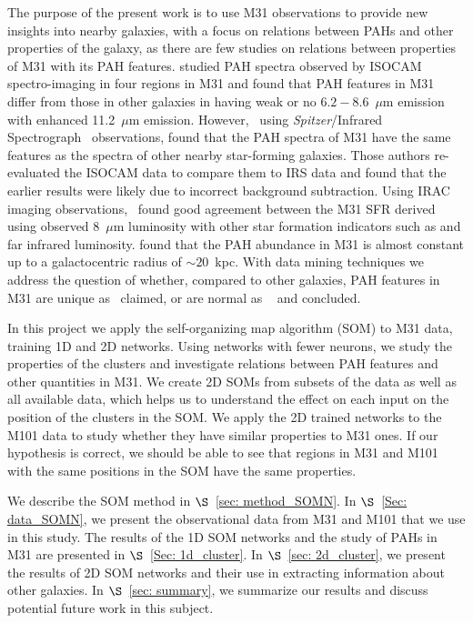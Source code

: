 The purpose of the present work is to use M31 observations to provide new insights into nearby galaxies, with a focus on relations between PAHs and other properties of the galaxy,
as there are few studies on relations between properties of M31 with its PAH features.
\cite{Cesarsky98} studied PAH spectra observed by ISOCAM spectro-imaging in four regions in M31 and found that PAH features in M31 differ from those in other galaxies in having weak or no $6.2 - 8.6$~$\mu$m emission with enhanced 11.2~$\mu$m emission. 
However,~\cite{Dim15} using {\it Spitzer}/Infrared Spectrograph~\citep[IRS;][]{Houck04b} observations, found that the PAH spectra of M31 have the same features as the spectra of other nearby star-forming galaxies.
Those authors re-evaluated the ISOCAM data to compare them to IRS data and found that the earlier results were likely due to incorrect background subtraction.
Using IRAC imaging observations,~\cite{Barmby06} found good agreement between the M31 SFR derived using observed 8~$\mu$m luminosity with other 
star formation indicators such as \halpha and far infrared luminosity.
\cite{Draine14} found that the PAH abundance in M31 is almost constant up to a galactocentric radius of $\sim 20$~kpc.
With data mining techniques we address the question of whether,
compared to other galaxies, PAH features in M31 are unique as~\cite{Cesarsky98} claimed, or  are normal as ~\cite{Dim15} and \cite{Draine14} concluded.


In this project we apply the self-organizing map algorithm (SOM) to M31 data, training 1D and 2D networks.
Using networks with fewer neurons, we study the properties of the clusters and investigate relations between PAH features and other quantities in M31.
We create 2D SOMs from subsets of the data as well as all available data, which helps us to understand the effect on each input on the position of the clusters in the SOM.
We apply the 2D trained networks to the M101 data to study whether they have similar properties to M31 ones.
If our hypothesis is correct, we should be able to see that regions in M31 and M101 with the same positions in the SOM have the same properties.


We describe the SOM method in $\S$~\ref{sec: method_SOMN}. 
In $\S$~\ref{Sec: data_SOMN}, we present the observational data from M31 and M101 that we use in this study.
The results of the 1D SOM networks and the study of PAHs in M31 are presented in $\S$~\ref{Sec: 1d_cluster}.
In $\S$~\ref{sec: 2d_cluster}, we present the results of 2D SOM networks and their use in extracting information about other galaxies.
In $\S$~\ref{sec: summary}, we summarize our results and discuss potential future work in this subject.